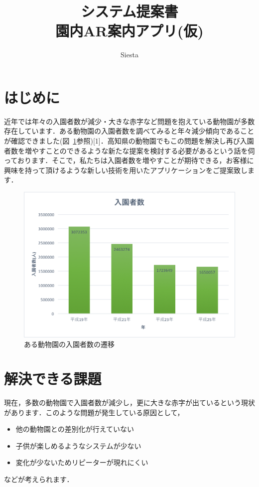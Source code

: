\documentclass[a4j]{jarticle}
\title{
\vspace{30mm}
{\bf システム提案書} 
\\
\vspace{5mm}
{\bf 園内AR案内アプリ(仮)}
\vspace{90mm}
}
\author{
\vspace{5mm}
Siesta \\
}
\begin{document}
\maketitle

\newpage

\tableofcontents

\newpage

\section{はじめに}
近年では年々の入園者数が減少・大きな赤字など問題を抱えている動物園が多数存在しています．ある動物園の入園者数を調べてみると年々減少傾向であることが確認できました(図~\ref{nyuensya}参照)[1]．高知県の動物園でもこの問題を解決し再び入園者数を増やすことのできるような新たな提案を検討する必要があるという話を伺っております．そこで，私たちは入園者数を増やすことが期待できる，お客様に興味を持って頂けるような新しい技術を用いたアプリケーションをご提案致します．

\begin{figure}[H]
	\begin{center}
		\includegraphics[width=0.5 \linewidth]{nyuensya.png}
		\caption{ある動物園の入園者数の遷移}
		\label{nyuensya}
	\end{center}
\end{figure}


\section{解決できる課題}
現在，多数の動物園で入園者数が減少し，更に大きな赤字が出ているという現状があります．このような問題が発生している原因として，
\begin{itemize}
	\item 他の動物園との差別化が行えていない
	\item 子供が楽しめるようなシステムが少ない
	\item 変化が少ないためリピーターが現れにくい
\end{itemize}
などが考えられます．
\end{document}
